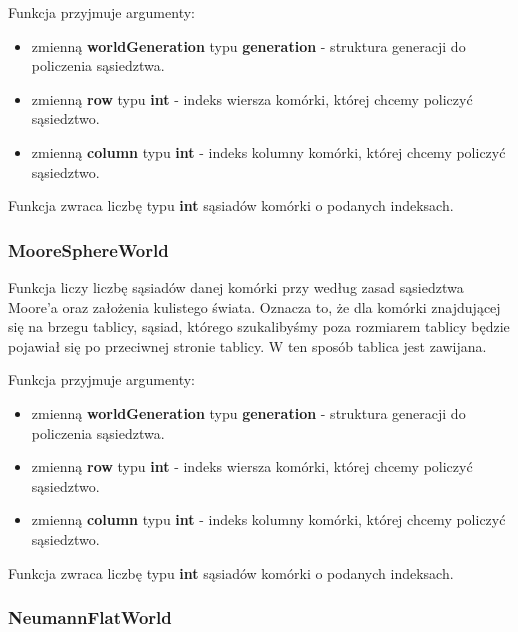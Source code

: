 \documentclass[a4paper]{article}
\begin{document}
Funkcja przyjmuje argumenty:

\begin{itemize}
        \item zmienn\k{a} \textbf{worldGeneration} typu \textbf{generation} - struktura generacji do policzenia s\k{a}siedztwa.
	\item zmienn\k{a} \textbf{row} typu \textbf{int} - indeks wiersza kom\'orki, kt\'orej chcemy policzy\'c s\k{a}siedztwo.
	\item zmienn\k{a} \textbf{column} typu \textbf{int} - indeks kolumny kom\'orki, kt\'orej chcemy policzy\'c s\k{a}siedztwo.
\end{itemize}

\quad Funkcja zwraca liczb\k{e} typu \textbf{int} s\k{a}siad\'ow kom\'orki o podanych indeksach.

\subsubsection{MooreSphereWorld}

\quad Funkcja liczy liczb\k{e} s\k{a}siad\'ow danej kom\'orki przy wed\l{}ug zasad s\k{a}siedztwa Moore'a oraz za\l{}o\.zenia kulistego \'swiata.
Oznacza to, \.ze dla kom\'orki znajduj\k{a}cej si\k{e} na brzegu tablicy, s\k{a}siad, kt\'orego szukaliby\'smy poza rozmiarem tablicy b\k{e}dzie pojawia\l{} si\k{e} po przeciwnej stronie tablicy. 
W ten spos\'ob tablica jest zawijana.

Funkcja przyjmuje argumenty:

\begin{itemize}
        \item zmienn\k{a} \textbf{worldGeneration} typu \textbf{generation} - struktura generacji do policzenia s\k{a}siedztwa.
        \item zmienn\k{a} \textbf{row} typu \textbf{int} - indeks wiersza kom\'orki, kt\'orej chcemy policzy\'c s\k{a}siedztwo.
        \item zmienn\k{a} \textbf{column} typu \textbf{int} - indeks kolumny kom\'orki, kt\'orej chcemy policzy\'c s\k{a}siedztwo.
\end{itemize}

\quad Funkcja zwraca liczb\k{e} typu \textbf{int} s\k{a}siad\'ow kom\'orki o podanych indeksach.


\subsubsection{NeumannFlatWorld}
\end{document}
